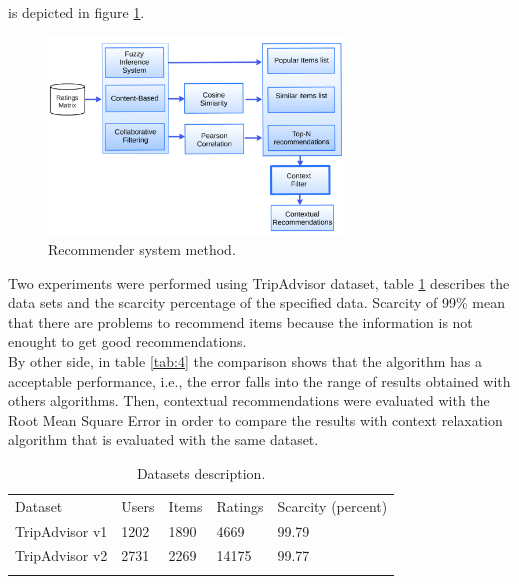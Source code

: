 is depicted in figure \ref{fig:architecture}.
\begin{figure}
\captionsetup{font=footnotesize}
\centering
\includegraphics[width=0.70\textwidth]{img/archit-ta.png}
\caption{Recommender system method.}
\label{fig:architecture}   
\end{figure}
Two experiments were performed using TripAdvisor dataset, table
\ref{tab:3} describes the data sets and the scarcity percentage of the
specified data. Scarcity of 99\% mean that there are problems to
recommend items because the information is not enought to get 
good recommendations.\\  By other side, in table \ref{tab:4} the comparison
shows that the algorithm has a acceptable performance, i.e., the error
falls into the range of results obtained with others algorithms. Then,
contextual recommendations were evaluated with the Root Mean Square
Error in order to compare the results with context relaxation
algorithm\cite{zheng2012differential} that is evaluated with the same
dataset.
\begin{table}
\centering
\small
\captionsetup{font=footnotesize}
\caption{Datasets description.}
\label{tab:3}      
\begin{tabular}{lllll}
\hline\noalign{\smallskip}
Dataset & Users & Items & Ratings & Scarcity (percent) \\
\noalign{\smallskip}\hline\noalign{\smallskip}
TripAdvisor v1 & 1202 & 1890 & 4669 & 99.79 \\
TripAdvisor v2 & 2731 & 2269 & 14175 & 99.77 \\
\noalign{\smallskip}\hline
\end{tabular}
\end{table}

